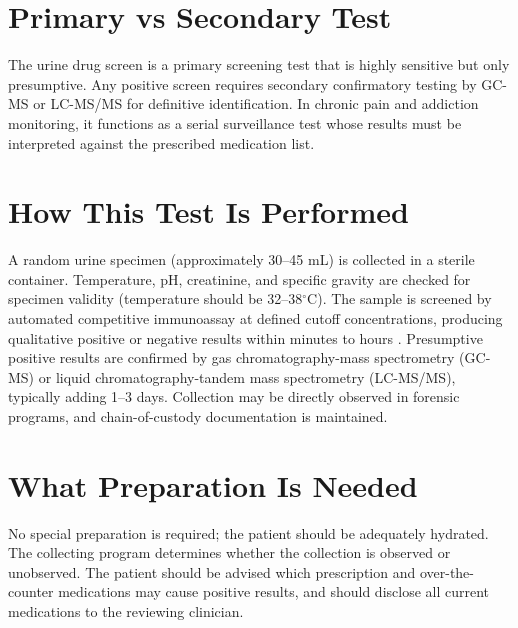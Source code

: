 \section*{Primary vs Secondary Test}
The urine drug screen is a primary screening test that is highly sensitive but only presumptive. Any positive screen requires secondary confirmatory testing by GC-MS or LC-MS/MS for definitive identification. In chronic pain and addiction monitoring, it functions as a serial surveillance test whose results must be interpreted against the prescribed medication list.
\section*{How This Test Is Performed}
A random urine specimen (approximately 30--45 mL) is collected in a sterile container. Temperature, pH, creatinine, and specific gravity are checked for specimen validity (temperature should be 32--38$^{\circ}$C). The sample is screened by automated competitive immunoassay at defined cutoff concentrations, producing qualitative positive or negative results within minutes to hours \cite{rifai2018tietz}. Presumptive positive results are confirmed by gas chromatography-mass spectrometry (GC-MS) or liquid chromatography-tandem mass spectrometry (LC-MS/MS), typically adding 1--3 days. Collection may be directly observed in forensic programs, and chain-of-custody documentation is maintained.
\section*{What Preparation Is Needed}
No special preparation is required; the patient should be adequately hydrated. The collecting program determines whether the collection is observed or unobserved. The patient should be advised which prescription and over-the-counter medications may cause positive results, and should disclose all current medications to the reviewing clinician.
